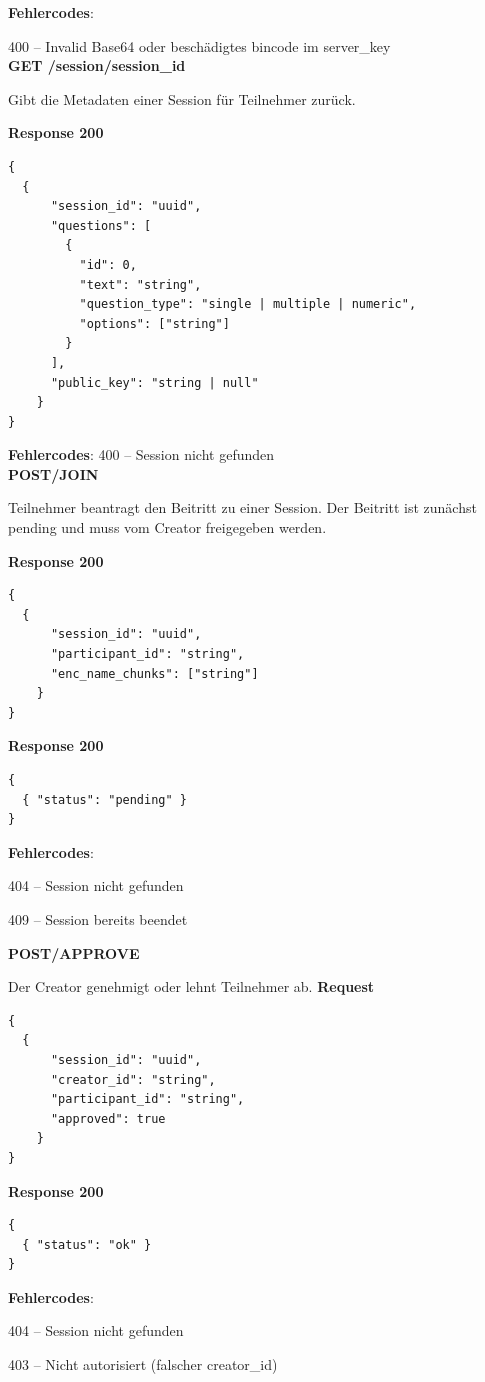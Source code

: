 \textbf{Fehlercodes}: 

400 – Invalid Base64 oder beschädigtes bincode im server\_key
\\

\textbf{GET /session/{session\_id}
}

Gibt die Metadaten einer Session für Teilnehmer zurück.

\textbf{Response 200}
\begin{lstlisting}
{
  {
      "session_id": "uuid",
      "questions": [
        {
          "id": 0,
          "text": "string",
          "question_type": "single | multiple | numeric",
          "options": ["string"]
        }
      ],
      "public_key": "string | null"
    }
}
\end{lstlisting}
\textbf{Fehlercodes}: 
400 – Session nicht gefunden
\\

\textbf{POST/JOIN}

Teilnehmer beantragt den Beitritt zu einer Session. Der Beitritt ist zunächst pending und muss vom Creator freigegeben werden.

\textbf{Response 200}
\begin{lstlisting}
{
  {
      "session_id": "uuid",
      "participant_id": "string",
      "enc_name_chunks": ["string"]
    }
}
\end{lstlisting}


\textbf{Response 200}
\begin{lstlisting}
{
  { "status": "pending" }
}
\end{lstlisting}
\textbf{Fehlercodes}:

404 – Session nicht gefunden

409 – Session bereits beendet

\textbf{POST/APPROVE}

Der Creator genehmigt oder lehnt Teilnehmer ab.
\textbf{Request}
\begin{lstlisting}
{
  {
      "session_id": "uuid",
      "creator_id": "string",
      "participant_id": "string",
      "approved": true
    }
}
\end{lstlisting}

\textbf{Response 200}
\begin{lstlisting}
{
  { "status": "ok" }
}
\end{lstlisting}
\textbf{Fehlercodes}:

404 – Session nicht gefunden

403 – Nicht autorisiert (falscher creator\_id)

